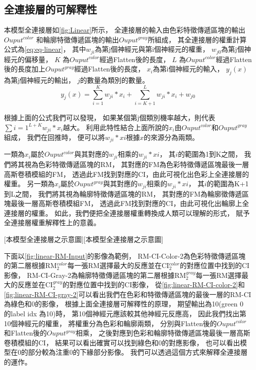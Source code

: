 \documentclass[class=NCU_thesis, crop=false]{standalone}
\begin{document}
\subsection{全連接層的可解釋性}
本模型全連接層如\cref{fig:Linear}所示，
全連接層的輸入由色彩特徵傳遞區塊的輸出$Ouput^{color}$
和輪廓特徵傳遞區塊的輸出$Ouput^{gray}$所組成，
其全連接層的權重計算公式為\cref{eq:eq-linear}，
其中$w_{ji}$為第j個神經元與第i個神經元的權重，
$w_{j0}$為第j個神經元的偏移量，
$K$ 為$Ouput^{color}$經過Flatten後的長度，
$L$ 為$Ouput^{color}$經過Flatten後的長度加上$Ouput^{gray}$經過Flatten後的長度，
$x_{i}$為第i個神經元的輸入，
$y_{j}(x)$為第j個神經元的輸出，
$j$的數量為類別的數量。
\begin{equation}
    \label{eq:eq-linear}
    y_{j}(x) = \sum_{i=1}^{K}w_{ji} * x_{i} + \sum_{i=K+1}^{L}w_{ji} * x_{i} + w_{j0}
\end{equation}

根據上面的公式我們可以發現，
如果某個第j個類別機率越大，則代表$\sum{i=1}^{L+K}w_{ji} * x_{i}$越大。
利用此特性結合上面所說的$x_{i}$由$Ouput^{color}$和$Ouput^{gray}$組成，
我們在回推時，
便可以將$w_{ji} * x{i}$根據$x$的來源分為兩類。

一類為$x_{i}$屬於$Ouput^{color}$與其對應的$w_{ji}$相乘的$w_{ji} * x{i}$，
其$i$的範圍為1到K之間，
我們將其視為色彩特徵傳遞區塊的RM，
其對應的FM為色彩特徵傳遞區塊最後一層高斯卷積模組的FM，
透過此FM找到對應的CI，由此可視化出色彩上全連接層的權重。
另一類為$x_{i}$屬於$Ouput^{gray}$與其對應的$w_{ji}$相乘的$w_{ji} * x{i}$，
其$i$的範圍為K+1到L之間，
我們將其視為輪廓特徵傳遞區塊的RM，
其對應的FM為輪廓徵傳遞區塊最後一層高斯卷積模組FM，
透過此FM找到對應的CI，由此可視化出輪廓上全連接層的權重。
如此，我們便把全連接層權重轉換成人類可以理解的形式，
賦予全連接層權重解釋性上的意義。

[本模型全連接層之示意圖][本模型全連接層之示意圖]

下面以\cref{fig:linear-RM-Input}的影像為範例，
RM-CI-Color-2為色彩特徵傳遞區塊的第二層根據RM$^{color}_{2}$每一張RM選擇最大的反應並在CI$^{color}_{2}$的對應位置中找到的CI影像，
RM-CI-Gray-2為輪廓特徵傳遞區塊的第二層根據RM$^{gray}_{2}$每一張RM選擇最大的反應並在CI$^{gray}_{2}$的對應位置中找到的CI影像，
從\cref{fig:linear-RM-CI-color-2}和\cref{fig:linear-RM-CI-gray-2}可以看出我們在色彩和特徵傳遞區塊的最後一層的RM-CI為綠色和0的影像，
根據上面全連接層可解釋性的原理，
期望輸出為10(green 0 的label idx 為10)時，
第10個神經元應該較其他神經元反應高，
因此我們找出第10個神經元的權重，
將權重分為色彩和輪廓兩類，
分別與Flatten後的$Ouput^{color}$和Flatten後的$Ouput^{gray}$相乘，
之後對應到色彩和輪廓特徵傳遞區塊最後一層高斯卷積模組的CI，
結果可以看出確實可以找到綠色和0的對應影像，
也可以看出模型在0的部分較為注重0的下緣部分影像。
我們可以透過這個方式來解釋全連接層的運作。
\end{document}
